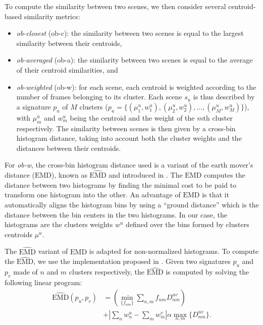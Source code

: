 \documentclass[journal]{IEEEtran}
\newcommand*{\EMD}{\mathrm{EMD}}
\begin{document}
To compute the similarity between two scenes, we then consider several centroid-based similarity metrics:
\begin{itemize}
\item \emph{ob-closest} (ob-c): the similarity between two scenes is equal to the largest similarity between their centroids,
\item \emph{ob-averaged} (ob-a): the similarity between two scenes is equal to the average of their centroid similarities, and
\item \emph{ob-weighted} (ob-w): for each scene, each centroid is weighted according to the number of frames belonging to its cluster. Each scene $s_u$ is thus described by a signature $p_u$ of $M$ clusters ($p_u=\lbrace(\mu_1^u,w_1^u),(\mu_2^u,w_2^u),\ldots,(\mu_M^u,w_M^u)\rbrace$), with $\mu_m^u$ and $w_m^u$ being the centroid and the weight of the $m$th cluster respectively. The similarity between scenes is then given by a cross-bin histogram distance, taking into account both the cluster weights and the distances between their centroids.
\end{itemize}

For \emph{ob-w}, the cross-bin histogram distance used is a variant of the earth mover's distance ($\EMD$), known as $\widehat{\EMD}$ and introduced in \cite{pele2008linear}. The $\EMD$ computes the distance between two histograms by finding the minimal cost to be paid to transform one histogram into the other. An advantage of $\EMD$ is that it automatically aligns the histogram bins by using a ``ground distance'' which is the distance between the bin centers in the two histograms. In our case, the histograms are the clusters weights $w^u$ defined over the bins formed by clusters centroids $\mu^u$.

The $\widehat{\EMD}$ variant of $\EMD$ is adapted for non-normalized histograms. To compute the $\widehat{\EMD}$, we use the implementation proposed in \cite{pele2009fast}. Given two signatures $p_u$ and $p_v$ made of $n$ and $m$ clusters respectively, the $\widehat{\EMD}$ is computed by solving the following linear program:
\begin{equation}
\begin{split}
\widehat{\EMD}(p_u,p_v) &=\left( \min\limits_{\lbrace f_{nm}\rbrace} \sum\limits_{n,m} f_{nm}D_{nm}^{uv} \right) \\
&+ \left|\sum\limits_{n} w_n^u - \sum\limits_{m} w_m^v  \right| \alpha \max\limits_{n,m}\lbrace  D_{nm}^{uv}\rbrace.
\end{split}
\end{equation}
\end{document}
